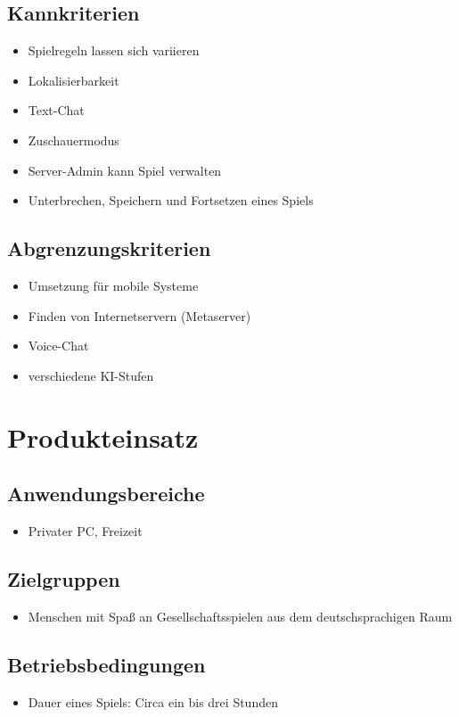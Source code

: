 \documentclass[a4paper,10pt]{article}
\begin{document}
\subsection{Kannkriterien}
\begin{itemize}
\item Spielregeln lassen sich variieren
\item Lokalisierbarkeit
\item Text-Chat
\item Zuschauermodus
\item Server-Admin kann Spiel verwalten
\item Unterbrechen, Speichern und Fortsetzen eines Spiels
\end{itemize}
\subsection{Abgrenzungskriterien}
\begin{itemize}
\item Umsetzung für mobile Systeme 
\item Finden von Internetservern (Metaserver)
\item Voice-Chat
\item verschiedene KI-Stufen
\end{itemize}
\newpage
\section{Produkteinsatz}
\subsection{Anwendungsbereiche}
\begin{itemize}
\item Privater PC, Freizeit
\end{itemize}
\subsection{Zielgruppen}
\begin{itemize}
\item Menschen mit Spaß an Gesellschaftsspielen aus dem deutschsprachigen Raum
\end{itemize}
\subsection{Betriebsbedingungen}
\begin{itemize}
\item Dauer eines Spiels: Circa ein bis drei Stunden
\end{itemize}
\end{document}
